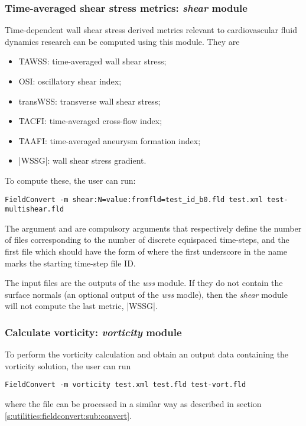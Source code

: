 %
%
%
\subsubsection{Time-averaged shear stress metrics: \textit{shear} module}
Time-dependent wall shear stress derived metrics relevant to cardiovascular fluid dynamics research can be computed using this module. They are

\begin{itemize}
\item TAWSS: time-averaged wall shear stress;
\item OSI: oscillatory shear index;
\item transWSS: transverse wall shear stress;
\item TACFI: time-averaged cross-flow index;
\item TAAFI: time-averaged aneurysm formation index;
\item |WSSG|: wall shear stress gradient.
\end{itemize}

To compute these, the user can run:
\begin{lstlisting}[style=BashInputStyle] 
FieldConvert -m shear:N=value:fromfld=test_id_b0.fld test.xml test-multishear.fld
\end{lstlisting}
The argument  and  are compulsory arguments that respectively define the number of  files corresponding to the number of discrete equispaced time-steps, and the first  file which should have the form of  where the first underscore in the name marks the starting time-step file ID. 

The input  files are the outputs of the \textit{wss} module. If they do not contain the surface normals (an optional output of the \textit{wss} modle), then the \textit{shear} module will not compute the last metric, |WSSG|. 

%
%
%
\subsubsection{Calculate vorticity: \textit{vorticity} module}
To perform the vorticity calculation and obtain an output 
data containing the vorticity solution, the user can run
\begin{lstlisting}[style=BashInputStyle]
FieldConvert -m vorticity test.xml test.fld test-vort.fld
\end{lstlisting}
where the file  can be processed in a similar 
way as described in section \ref{s:utilities:fieldconvert:sub:convert}.
%
%
%

